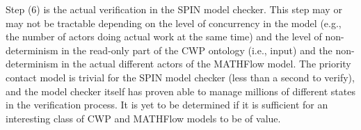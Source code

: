 Step (6) is the actual verification in the SPIN model checker. This
step may or may not be tractable depending on the level of concurrency
in the model (e.g., the number of actors doing actual work at the same
time) and the level of non-determinism in the read-only part of the
CWP ontology (i.e., input) and the non-determinism in the actual
different actors of the MATHFlow model. The priority contact model is
trivial for the SPIN model checker (less than a second to verify), and
the model checker itself has proven able to manage millions of
different states in the verification process. It is yet to be
determined if it is sufficient for an interesting class of CWP and
MATHFlow models to be of value.

